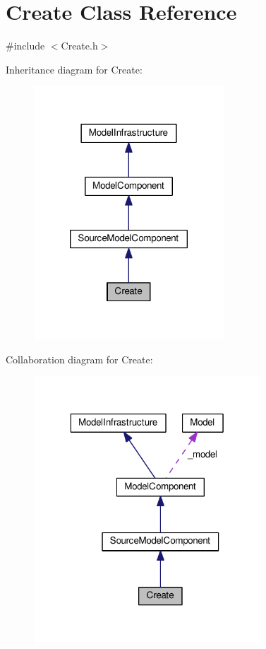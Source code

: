 \hypertarget{class_create}{\section{Create Class Reference}
\label{class_create}
}


{\ttfamily \#include $<$Create.\-h$>$}



Inheritance diagram for Create\-:\nopagebreak
\begin{figure}[H]
\begin{center}
\leavevmode
\includegraphics[width=202pt]{class_create__inherit__graph}
\end{center}
\end{figure}


Collaboration diagram for Create\-:\nopagebreak
\begin{figure}[H]
\begin{center}
\leavevmode
\includegraphics[width=241pt]{class_create__coll__graph}
\end{center}
\end{figure}
